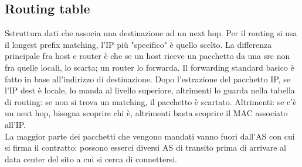 \documentclass[12pt, oneside]{extbook} %
\begin{document}
\subsection{Routing table}
Sstruttura dati che associa una destinazione ad un next hop. Per il routing si usa il longest prefix matching, l'IP più "specifico" è quello scelto. La differenza principale fra host e router è che se un host riceve un pacchetto da una src non fra quelle locali, lo scarta; un router lo forwarda. Il forwarding standard basico è fatto in base all'indirizzo di destinazione. Dopo l'estrazione del pacchetto IP, se l'IP dest è locale, lo manda al livello superiore, altrimenti lo guarda nella tabella di routing: se non si trova un matching, il pacchetto è scartato. Altrimenti: se c'è un next hop, bisogna scoprire chi è, altrimenti basta scoprire il MAC associato all'IP.\\ La maggior parte dei pacchetti che vengono mandati vanno fuori dall'AS con cui si firma il contratto: possono esserci diversi AS di transito prima di arrivare al data center del sito a cui si cerca di connettersi.
\end{document}
